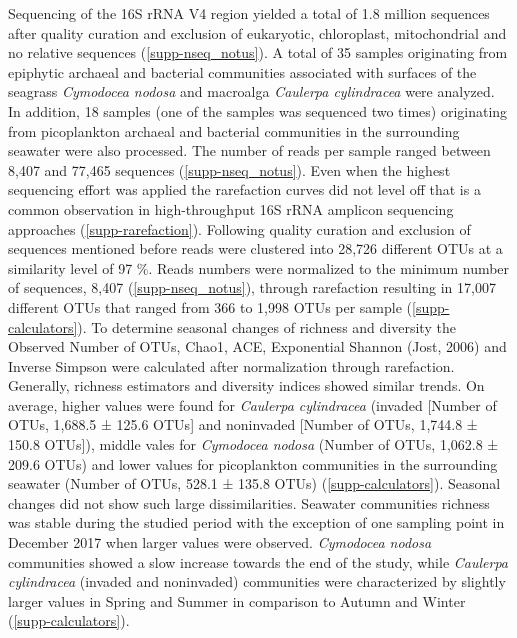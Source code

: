 \documentclass[12pt,]{article}
\begin{document}
Sequencing of the 16S rRNA V4 region yielded a total of 1.8 million
sequences after quality curation and exclusion of eukaryotic,
chloroplast, mitochondrial and no relative sequences
(\autoref{supp-nseq_notus}). A total of 35 samples originating from
epiphytic archaeal and bacterial communities associated with surfaces of
the seagrass \emph{Cymodocea nodosa} and macroalga \emph{Caulerpa
cylindracea} were analyzed. In addition, 18 samples (one of the samples
was sequenced two times) originating from picoplankton archaeal and
bacterial communities in the surrounding seawater were also processed.
The number of reads per sample ranged between 8,407 and 77,465 sequences
(\autoref{supp-nseq_notus}). Even when the highest sequencing effort was
applied the rarefaction curves did not level off that is a common
observation in high-throughput 16S rRNA amplicon sequencing approaches
(\autoref{supp-rarefaction}). Following quality curation and exclusion
of sequences mentioned before reads were clustered into 28,726 different
OTUs at a similarity level of 97 \si{\percent}. Reads numbers were
normalized to the minimum number of sequences, 8,407
(\autoref{supp-nseq_notus}), through rarefaction resulting in 17,007
different OTUs that ranged from 366 to 1,998 OTUs per sample
(\autoref{supp-calculators}). To determine seasonal changes of richness
and diversity the Observed Number of OTUs, Chao1, ACE, Exponential
Shannon (Jost, 2006) and Inverse Simpson were calculated after
normalization through rarefaction. Generally, richness estimators and
diversity indices showed similar trends. On average, higher values were
found for \emph{Caulerpa cylindracea} (invaded {[}Number of OTUs,
1,688.5 ± 125.6 OTUs{]} and noninvaded {[}Number of OTUs, 1,744.8 ±
150.8 OTUs{]}), middle vales for \emph{Cymodocea nodosa} (Number of
OTUs, 1,062.8 ± 209.6 OTUs) and lower values for picoplankton
communities in the surrounding seawater (Number of OTUs, 528.1 ± 135.8
OTUs) (\autoref{supp-calculators}). Seasonal changes did not show such
large dissimilarities. Seawater communities richness was stable during
the studied period with the exception of one sampling point in December
2017 when larger values were observed. \emph{Cymodocea nodosa}
communities showed a slow increase towards the end of the study, while
\emph{Caulerpa cylindracea} (invaded and noninvaded) communities were
characterized by slightly larger values in Spring and Summer in
comparison to Autumn and Winter (\autoref{supp-calculators}).
\end{document}
